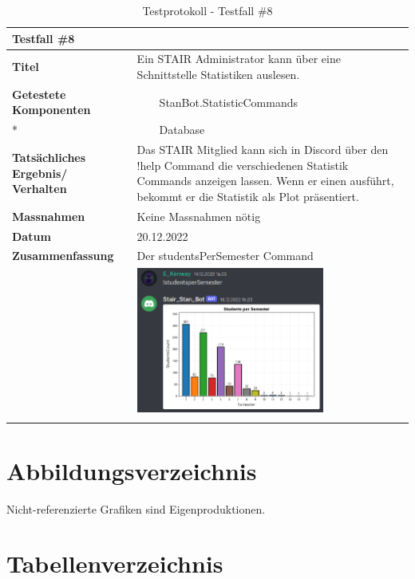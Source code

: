 \documentclass[a4paper, table]{article}
\newcommand{\tabitem}{~~\llap{\textbullet}~~}
\begin{document}
\begin{longtable}[h]{|p{9em}|p{31em}|}
    \hline
    \multicolumn{2}{|l|}{\textbf{Testfall \#8}} \\
    \hline
    \textbf{Titel} & Ein STAIR Administrator kann über eine Schnittstelle Statistiken auslesen. \\
    \hline
    \textbf{Getestete Komponenten} & 
        \tabitem StanBot.StatisticCommands \\ *
     &  \tabitem Database \\
    \hline
    \textbf{Tatsächliches Ergebnis/ Verhalten} & 
        Das STAIR Mitglied kann sich in Discord über den !help Command die verschiedenen Statistik Commands anzeigen lassen. 
        Wenn er einen ausführt, bekommt er die Statistik als Plot präsentiert. \\
    \hline
    \textbf{Massnahmen} & Keine Massnahmen nötig\\
    \hline
    \textbf{Datum} & 20.12.2022\\
    \hline
    \textbf{Zusammenfassung} & 
        Der studentsPerSemester Command \\*
     &  \includegraphics[width=0.7\textwidth]{img/Tests/8_Test_statisticCommand.png} \\
    \hline
    \caption{Testprotokoll - Testfall \#8}
\end{longtable}

\newpage
\section{Abbildungsverzeichnis}
\listoffigures

Nicht-referenzierte Grafiken sind Eigenproduktionen.

\section{Tabellenverzeichnis}
\listoftables
\end{document}
